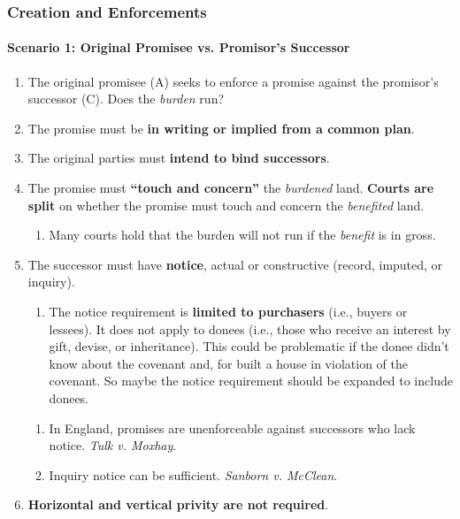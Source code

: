 \subsubsection{Creation and Enforcements}

\paragraph{Scenario 1: Original Promisee vs. Promisor's Successor}

\begin{enumerate}
    \item The original promisee (A) seeks to enforce a promise against the 
    promisor's  successor (C). Does the \emph{burden} run?
    \item The promise must be \textbf{in writing or implied from a common 
    plan}.
    \item The original parties must \textbf{intend to bind successors}.
    \item The promise must \textbf{``touch and concern''} the \emph{burdened} 
    land. \textbf{Courts are split} on whether the promise must touch and 
    concern the \emph{benefited} land.
    \begin{enumerate}
        \item Many courts hold that the burden will not run if the 
        \emph{benefit} is in gross. %
    \end{enumerate}
    \item The successor must have \textbf{notice}, actual or constructive 
    (record, imputed, or inquiry).
    \begin{enumerate}
        \item The notice requirement is \textbf{limited to purchasers} (i.e., 
        buyers or lessees). It does not apply to donees (i.e., those who 
        receive an interest by gift, devise, or inheritance). This could be 
        problematic if the donee didn't know about the covenant and, for 
        built a house in violation of the covenant. So maybe the notice 
        requirement should be expanded to include donees. 
    \end{enumerate}
    \begin{enumerate}
        \item In England, promises are unenforceable against successors who 
        lack notice. \emph{Tulk v. Moxhay}.
        \item Inquiry notice can be sufficient. \emph{Sanborn v. McClean}.
    \end{enumerate}
    \item \textbf{Horizontal and vertical privity are not required}.
\end{enumerate}

